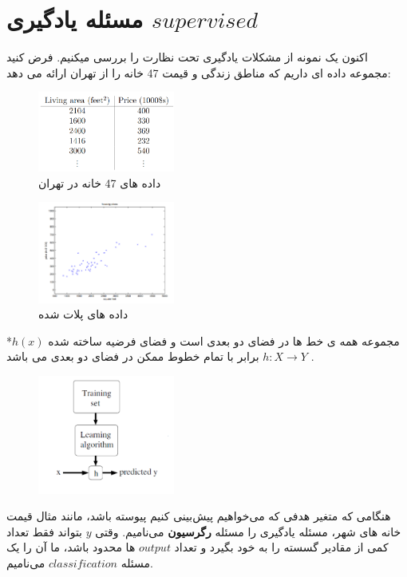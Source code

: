 \documentclass[12pt]{article}
\begin{document}
\fontsize{12pt}{14pt}\selectfont


\section*{مسئله یادگیری $supervised$}
اکنون یک نمونه از مشکلات یادگیری تحت نظارت را بررسی میکنیم. فرض کنید مجموعه داده ای داریم که مناطق زندگی و قیمت 47 خانه را از تهران ارائه می دهد:

\begin{figure}[htbp]
  \centering
  \includegraphics[width=0.4\textwidth]{etc/Images/Fig1.png} 
  \caption{داده های 47 خانه در تهران}
  \label{fig1}
\end{figure}

\begin{figure}[htbp]
  \centering
  \includegraphics[width=0.4\textwidth]{etc/Images/Fig3.png} 
  \caption{داده های پلات شده}
  \label{fig3}
\end{figure}


*$h(x)$ مجموعه همه ی خط ها در فضای دو بعدی است و فضای فرضیه ساخته شده 
$h : X\longrightarrow Y$
برابر با تمام خطوط ممکن در فضای دو بعدی می باشد .

\begin{figure}[htbp]
  \centering
  \includegraphics[width=0.4\textwidth]{etc/Images/Fig2.png} 
  \label{fig2}
\end{figure}
هنگامی که متغیر هدفی که می‌خواهیم پیش‌بینی کنیم پیوسته باشد، مانند مثال قیمت خانه های شهر، مسئله یادگیری را مسئله \textbf{رگرسیون} می‌نامیم. وقتی $y$ بتواند فقط تعداد کمی از مقادیر گسسته را به خود بگیرد و تعداد $output$ ها محدود باشد، ما آن را یک مسئله $classification$ می‌نامیم.
\end{document}
